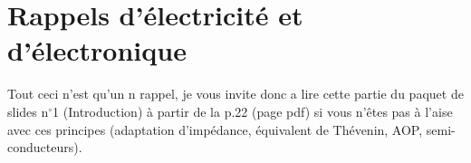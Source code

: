 \section{Rappels d'électricité et d'électronique}
Tout ceci n'est qu'un n rappel, je vous invite donc a lire cette partie du paquet de slides n$^\circ$1 (Introduction) à partir de la p.22 (page pdf) si vous n'êtes pas à l'aise avec ces principes (adaptation d'impédance, équivalent de Thévenin, AOP, semi-conducteurs).